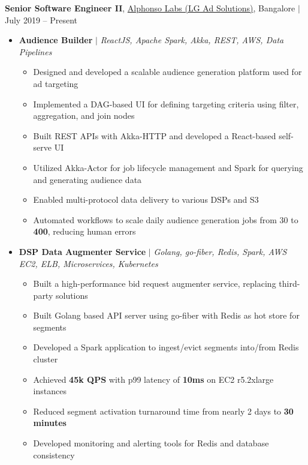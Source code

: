 \documentclass[9pt]{extletter}
\begin{document}
{\textbf{Senior Software Engineer II}}, \href{https://lgads.tv}{Alphonso Labs (LG Ad Solutions)}, Bangalore $|$ July 2019 -- Present
\vspace{-5pt}
\begin{itemize}
    \item \textbf{Audience Builder} $|$ {\textsl{ReactJS, Apache Spark, Akka, REST, AWS, Data Pipelines}}
    \begin{itemize}
        \itemsep2pt
        \item Designed and developed a scalable audience generation platform used for ad targeting
        \item Implemented a DAG-based UI for defining targeting criteria using filter, aggregation, and join nodes
        \item Built REST APIs with Akka-HTTP and developed a React-based self-serve UI
        \item Utilized Akka-Actor for job lifecycle management and Spark for querying and generating audience data
        \item Enabled multi-protocol data delivery to various DSPs and S3
        \item Automated workflows to scale daily audience generation jobs from 30 to \textbf{400}, reducing human errors
    \end{itemize}
    
    \item \textbf{DSP Data Augmenter Service} $|$ {\textsl{Golang, go-fiber, Redis, Spark, AWS EC2, ELB, Microservices, Kubernetes}}
    \begin{itemize}
        \itemsep2pt
        \item Built a high-performance bid request augmenter service, replacing third-party solutions
        \item Built Golang based API server using go-fiber with Redis as hot store for segments
        \item Developed a Spark application to ingest/evict segments into/from Redis cluster
        \item Achieved \textbf{45k QPS} with p99 latency of \textbf{10ms} on EC2 r5.2xlarge instances
        \item Reduced segment activation turnaround time from nearly 2 days to \textbf{30 minutes}
        \item Developed monitoring and alerting tools for Redis and database consistency
    \end{itemize}
    

\end{itemize}
\end{document}

